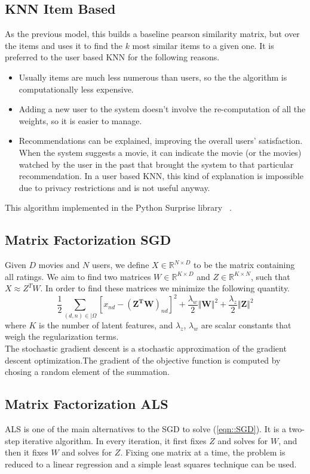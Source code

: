 \documentclass[10pt,conference,compsocconf]{IEEEtran}
\begin{document}
\subsection{KNN Item Based}
As the previous model, this builds a baseline pearson similarity matrix, but over the items and uses it to find the $k$ most similar items to a given one. It is preferred to the user based KNN for the following reasons.
\begin{itemize}
\item Usually items are much less numerous than users, so the the algorithm is computationally less expensive.
\item Adding a new user to the system doesn't involve the re-computation of all the weights, so it is easier to manage.
\item Recommendations can be explained, improving the overall users' satisfaction. When the system suggests a movie, it can indicate the movie (or the movies) watched by the user in the past that brought the system to that particular recommendation. In a user based KNN, this kind of explanation is impossible due to privacy restrictions and is not useful anyway.
\end{itemize}
This algorithm implemented in the Python Surprise library ~\cite{Surprise}.
\subsection{Matrix Factorization SGD}
Given $D$ movies and $N$ users, we define  $X \in {\mathbb{R}}^{N \times D}$ to be the matrix containing all ratings. We aim to find two matrices $W \in {\mathbb{R}}^{K \times D}$ and  $Z \in {\mathbb{R}}^{K \times N}$, such that $X \approx Z^{T}W$. In order to find these matrices we minimize the following quantity.
\begin{equation}\label{eqn::SGD}
\frac{1}{2} \sum_{(d, n) \in |\Omega}{} [x_{nd} -(\mathbf{Z^TW})_{nd}]^2 + \frac{\lambda _w}{2} \Vert \mathbf{W} \Vert ^2 + \frac{\lambda _z}{2} \Vert \mathbf{Z} \Vert ^2 
\end{equation}
where $K$ is the number of latent features, and $\lambda_{z}$, $\lambda_{w}$ are scalar constants that weigh the regularization terms. \\
The stochastic gradient descent is a stochastic approximation of the gradient descent optimization.The gradient of the objective function is computed by chosing a random element of the summation.
\subsection{Matrix Factorization ALS}
ALS is one of the main alternatives to the SGD to solve (\ref{eqn::SGD}). It is a two-step iterative algorithm. In every iteration, it first fixes $Z$ and solves for $W$, and then it fixes $W$ and solves for $Z$. Fixing one matrix at a time, the problem is reduced to a linear regression and a simple least squares technique can be used. 
\end{document}
